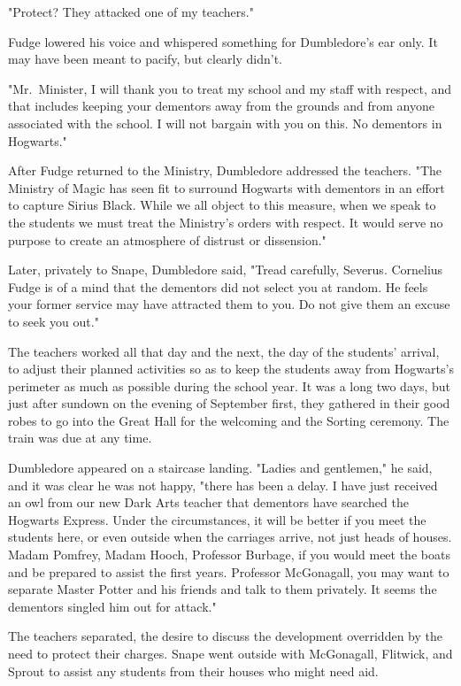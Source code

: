 "Protect? They attacked one of my teachers."

Fudge lowered his voice and whispered something for Dumbledore's ear only. It may have been meant to pacify, but clearly didn't.

"Mr.~Minister, I will thank you to treat my school and my staff with respect, and that includes keeping your dementors away from the grounds and from anyone associated with the school. I will not bargain with you on this. No dementors in Hogwarts."

After Fudge returned to the Ministry, Dumbledore addressed the teachers. "The Ministry of Magic has seen fit to surround Hogwarts with dementors in an effort to capture Sirius Black. While we all object to this measure, when we speak to the students we must treat the Ministry's orders with respect. It would serve no purpose to create an atmosphere of distrust or dissension."

Later, privately to Snape, Dumbledore said, "Tread carefully, Severus. Cornelius Fudge is of a mind that the dementors did not select you at random. He feels your former service may have attracted them to you. Do not give them an excuse to seek you out."

The teachers worked all that day and the next, the day of the students' arrival, to adjust their planned activities so as to keep the students away from Hogwarts's perimeter as much as possible during the school year. It was a long two days, but just after sundown on the evening of September first, they gathered in their good robes to go into the Great Hall for the welcoming and the Sorting ceremony. The train was due at any time.

Dumbledore appeared on a staircase landing. "Ladies and gentlemen," he said, and it was clear he was not happy, "there has been a delay. I have just received an owl from our new Dark Arts teacher that dementors have searched the Hogwarts Express. Under the circumstances, it will be better if you meet the students here, or even outside when the carriages arrive, not just heads of houses. Madam Pomfrey, Madam Hooch, Professor Burbage, if you would meet the boats and be prepared to assist the first years. Professor McGonagall, you may want to separate Master Potter and his friends and talk to them privately. It seems the dementors singled him out for attack."

The teachers separated, the desire to discuss the development overridden by the need to protect their charges. Snape went outside with McGonagall, Flitwick, and Sprout to assist any students from their houses who might need aid.

